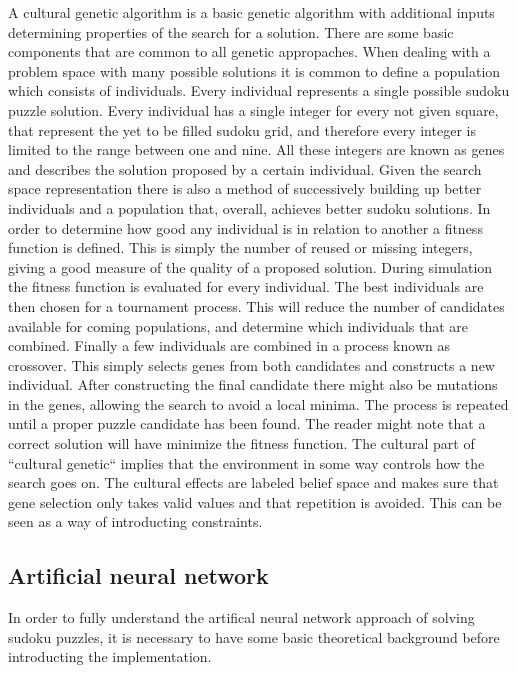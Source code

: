 \documentclass[a4paper,11pt]{kth-mag}
\begin{document}
A cultural genetic algorithm is a basic genetic algorithm with additional inputs determining properties of the search for a solution.
 There are some basic components that are common to all genetic appropaches. \newline
When dealing with a problem space with many possible solutions it is common to define a population which consists of individuals.
Every individual represents a single possible sudoku puzzle solution.
Every individual has a single integer for every not given square, that represent the yet to be filled sudoku grid, and therefore every integer is limited to the range between one and nine.
All these integers are known as genes and describes the solution proposed by a certain individual. \newline
Given the search space representation there is also a method of successively building up better individuals and a population that, overall, achieves better sudoku solutions.
In order to determine how good any individual is in relation to another a fitness function is defined.
This is simply the number of reused or missing integers, giving a good measure of the quality of a proposed solution.
During simulation the fitness function is evaluated for every individual.
The best individuals are then chosen for a tournament process.
This will reduce the number of candidates available for coming populations, and determine which individuals that are combined.
Finally a few individuals are combined in a process known as crossover.
This simply selects genes from both candidates and constructs a new individual.
After constructing the final candidate there might also be mutations in the genes, allowing the search to avoid a local minima.
The process is repeated until a proper puzzle candidate has been found.
The reader might note that a correct solution will have minimize the fitness function. \newline
The cultural part of ``cultural genetic`` implies that the environment in some way controls how the search goes on.
The cultural effects are labeled belief space and makes sure that gene selection only takes valid values and that repetition is avoided.
This can be seen as a way of introducting constraints.

\subsection{Artificial neural network}
In order to fully understand the artifical neural network approach of solving sudoku puzzles, it is necessary to have some basic theoretical background before introducting the implementation.
\end{document}
